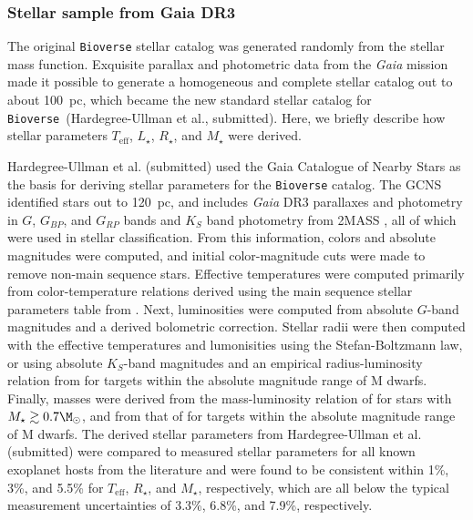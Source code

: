 \documentclass[modern]{aastex631}
\begin{document}
\subsubsection{Stellar sample from Gaia DR3}
The original \texttt{Bioverse} stellar catalog was generated randomly from the \citet{Chabrier2003} stellar mass function. Exquisite parallax and photometric data from the \textit{Gaia} mission made it possible to generate a homogeneous and complete stellar catalog out to about 100~pc, which became the new standard stellar catalog for \texttt{Bioverse}~(Hardegree-Ullman et al., submitted). Here, we briefly describe how stellar parameters $T_{\mathrm{eff}}$, $L_{\star}$, $R_{\star}$, and $M_{\star}$ were derived.

Hardegree-Ullman et al. (submitted) used the Gaia Catalogue of Nearby Stars \citep[hereafter GCNS,][]{Smart2021} as the basis for deriving stellar parameters for the \texttt{Bioverse} catalog. The GCNS identified stars out to 120~pc, and includes \textit{Gaia} DR3 parallaxes and photometry in $G$, $G_{BP}$, and $G_{RP}$ bands \citep{GaiaCollaboration2021} and $K_S$ band photometry from 2MASS \citep{Cutri2003}, all of which were used in stellar classification. From this information, colors and absolute magnitudes were computed, and initial color-magnitude cuts were made to remove non-main sequence stars. Effective temperatures were computed primarily from color-temperature relations derived using the main sequence stellar parameters table from \citet{Pecaut2013}. Next, luminosities were computed from absolute $G$-band magnitudes and a derived bolometric correction. Stellar radii were then computed with the effective temperatures and lumonisities using the Stefan-Boltzmann law, or using absolute $K_S$-band magnitudes and an empirical radius-luminosity relation from \citet{Mann2015} for targets within the absolute magnitude range of M dwarfs.
Finally, masses were derived from the mass-luminosity relation of \citet{Torres2010} for stars with $M_{\star}\gtrsim0.7\M_{\odot}$, and from that of \citet{Mann2019} for targets within the absolute magnitude range of M dwarfs. The derived stellar parameters from Hardegree-Ullman et al. (submitted) were compared to measured stellar parameters for all known exoplanet hosts from the literature and were found to be consistent within 1\%, 3\%, and 5.5\% for $T_{\mathrm{eff}}$, $R_{\star}$, and $M_{\star}$, respectively, which are all below the typical measurement uncertainties of 3.3\%, 6.8\%, and 7.9\%, respectively.
\end{document}
